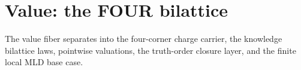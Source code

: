 \chapter{Value: the FOUR bilattice}\label{ch:positing}

The value fiber separates into the four-corner charge carrier, the knowledge
bilattice laws, pointwise valuations, the truth-order closure layer, and the
finite local MLD base case.







